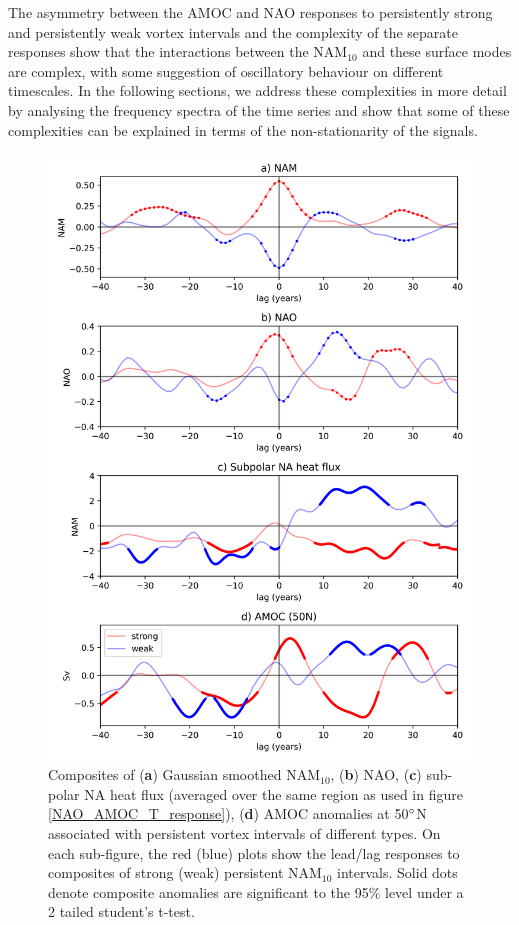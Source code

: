 The asymmetry between the AMOC and NAO responses to persistently strong and persistently weak vortex intervals and the complexity of the separate responses show that the interactions between the NAM$_{10}$ and these surface modes are complex, with some suggestion of oscillatory behaviour on different timescales. In the following sections, we address these complexities in more detail by analysing the frequency spectra of the time series and show that some of these complexities can be explained in terms of the non-stationarity of the signals.

\begin{figure}[h!]
\begin{center}
\noindent\includegraphics[width =0.6\linewidth]{Figures/Figures-surface/AMOC_NAO_NAM_responses_each_event_type.png} 
\caption[AMOC, NAO and heat flux responses to strong and weak NAM$_{10}$ intervals]{Composites of (\textbf{a}) Gaussian smoothed NAM$_{10}$, (\textbf{b}) NAO, (\textbf{c}) sub-polar NA heat flux (averaged over the same region as used in figure \ref{NAO_AMOC_T_response}), (\textbf{d}) AMOC anomalies at 50$\degree$N associated with persistent vortex intervals of different types. On each sub-figure, the red (blue) plots show the lead/lag responses to composites of strong (weak) persistent NAM$_{10}$ intervals. Solid dots denote composite anomalies are significant to the 95\% level under a 2 tailed student's t-test.}
\label{NAO_AMOC_response_individual_types}
\end{center}
\end{figure}

